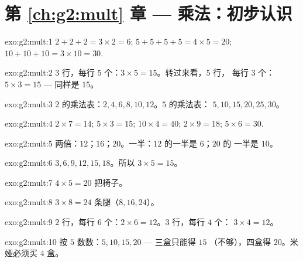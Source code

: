 \section*{第 \ref{ch:g2:mult} 章 --- 乘法：初步认识}

\begin{solution}{exo:g2:mult:1}
$2 + 2 + 2 = 3 \times 2 = 6$; \quad
$5 + 5 + 5 + 5 = 4 \times 5 = 20$; \quad
$10 + 10 + 10 = 3 \times 10 = 30$.
\end{solution}

\begin{solution}{exo:g2:mult:2}
$3$ 行，每行 $5$ 个：$3 \times 5 = 15$。转过来看，$5$ 行，
每行 $3$ 个：$5 \times 3 = 15$ --- 同样是 $15$。
\end{solution}

\begin{solution}{exo:g2:mult:3}
$2$ 的乘法表：$2, 4, 6, 8, 10, 12$。$5$ 的乘法表：
$5, 10, 15, 20, 25, 30$。
\end{solution}

\begin{solution}{exo:g2:mult:4}
$2 \times 7 = 14$; \quad $5 \times 3 = 15$; \quad
$10 \times 4 = 40$; \quad $2 \times 9 = 18$; \quad
$5 \times 6 = 30$.
\end{solution}

\begin{solution}{exo:g2:mult:5}
两倍：$12$；$16$；$20$。一半：$12$ 的一半是 $6$；$20$ 的
一半是 $10$。
\end{solution}

\begin{solution}{exo:g2:mult:6}
$3, 6, 9, 12, 15, 18$。所以 $3 \times 5 = 15$。
\end{solution}

\begin{solution}{exo:g2:mult:7}
$4 \times 5 = 20$ 把椅子。
\end{solution}

\begin{solution}{exo:g2:mult:8}
$3 \times 8 = 24$ 条腿（$8, 16, 24$）。
\end{solution}

\begin{solution}{exo:g2:mult:9}
$2$ 行，每行 $6$ 个：$2 \times 6 = 12$。$3$ 行，每行 $4$ 个：
$3 \times 4 = 12$。
\end{solution}

\begin{solution}{exo:g2:mult:10}
按 $5$ 数数：$5, 10, 15, 20$ --- 三盒只能得 $15$
（不够），四盒得 $20$。米娅必须买 $4$ 盒。
\end{solution}
